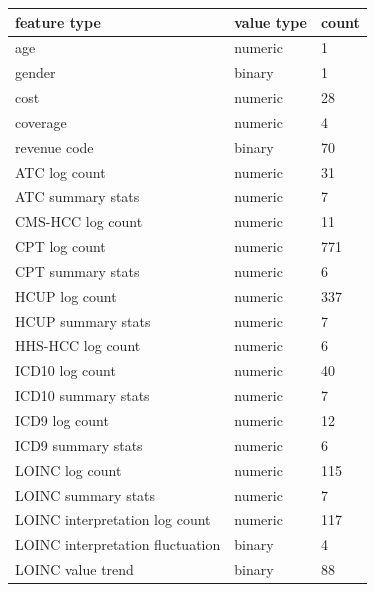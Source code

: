 \documentclass[letterpaper]{article} %
\begin{document}
\begin{table}[t]
 \centering
 \begin{tabular}{l l l} 
 \hline
 \hline
feature type & value type & count   \\  %
 \hline

age & numeric & 1  \\
gender & binary & 1 \\
cost & numeric & 28  \\
coverage & numeric & 4 \\
revenue code & binary & 70 \\

ATC log count & numeric & 31 \\
ATC summary stats & numeric & 7 \\

CMS-HCC log count & numeric & 11 \\

CPT log count & numeric & 771 \\
CPT summary stats & numeric & 6 \\
 
HCUP log count & numeric & 337 \\
HCUP summary stats & numeric & 7 \\  

HHS-HCC log count & numeric & 6 \\

ICD10 log count & numeric & 40 \\
ICD10 summary stats & numeric & 7 \\
ICD9 log count & numeric & 12 \\
ICD9 summary stats & numeric & 6 \\
LOINC log count & numeric & 115 \\
LOINC summary stats & numeric & 7 \\
LOINC interpretation log count & numeric & 117 \\
LOINC interpretation fluctuation & binary & 4 \\
LOINC value trend & binary & 88 \\


\end{tabular}
\end{table}
\end{document}
